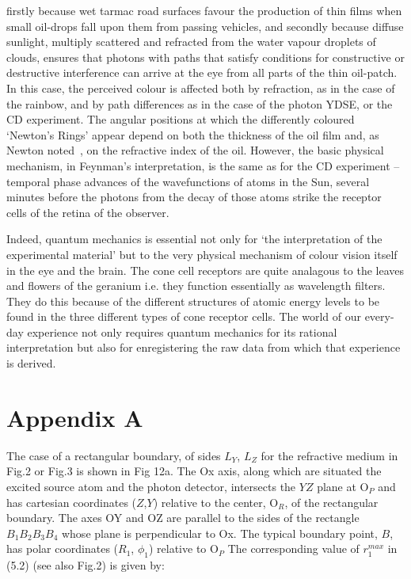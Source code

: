 \documentclass [12pt]{article}
\begin{document}
{     firstly because wet tarmac road surfaces favour the production of thin films when small oil-drops
     fall upon them from passing vehicles, and secondly because diffuse sunlight, multiply scattered
    and refracted from the water vapour droplets of clouds, ensures that photons with paths that satisfy conditions
    for constructive or destructive interference can arrive at the eye from all parts of the
    thin oil-patch. In this case, the perceived colour is affected both by refraction, as in the case
   of the rainbow, and by path differences as in the case of the photon YDSE, or the CD experiment.
    The angular positions at which the differently coloured `Newton's Rings' appear depend on
     both the thickness of the oil film and, as Newton noted~\cite{Newton}, on the refractive
    index of the oil. However, the basic physical mechanism, in Feynman's interpretation, is the same as for
    the CD experiment  --temporal phase advances of the wavefunctions of atoms in the Sun,
    several minutes before the photons from the decay of those atoms strike the receptor
    cells of the retina of the observer. 
    \par Indeed, quantum mechanics is essential not only for `the interpretation of the experimental
      material' but to the very physical mechanism of colour vision itself in the eye and the brain. 
     The cone cell receptors are quite analagous to the leaves and flowers of the geranium i.e. they function
   essentially as wavelength filters. They do this because of the different structures of atomic
   energy levels to be found in the three different types of cone receptor cells. The world of our
   every-day experience not only requires quantum mechanics for its rational interpretation
   but also for enregistering the raw data from which that experience is derived.


 \newpage
 \section* {\bf Appendix A}
 \par The case of a rectangular boundary, of sides $L_Y$, $L_Z$ for the refractive medium in Fig.2 or Fig.3
   is shown in Fig 12a. The Ox axis, along which are situated the excited source atom and the 
   photon detector, intersects the $YZ$ plane at O$_P$ and has cartesian coordinates ($Z$,$Y$)
 relative to the center, O$_R$, of the rectangular boundary. The axes OY and OZ are parallel to the sides
  of the rectangle $B_1 B_2 B_3 B_4$  whose plane is perpendicular to Ox. The
  typical boundary point, $B$, has polar coordinates ($R_1$, $\phi_1$) relative to O$_P$
   The corresponding value of $r_1^{max}$ in (5.2) (see also Fig.2) is given by:
 
}
\end{document}

